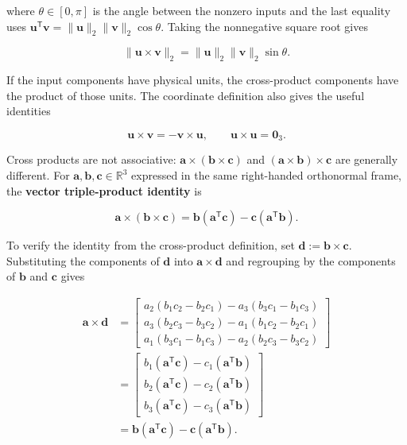 \documentclass[
  australian,
  12pt,
  letterpaper,
  DIV=11,
  numbers=noendperiod,
  twoside]{scrreprt}
\begin{document}
where \(\theta\in[0,\pi]\) is the angle between the nonzero inputs and
the last equality uses
\(\mathbf u^\mathsf T\mathbf v=\|\mathbf u\|_2\|\mathbf v\|_2\cos\theta\).
Taking the nonnegative square root gives

\[
\boxed{
\|\mathbf u\times\mathbf v\|_2
=
\|\mathbf u\|_2\|\mathbf v\|_2\sin\theta
}.
\]

If the input components have physical units, the cross-product
components have the product of those units. The coordinate definition
also gives the useful identities

\[
\boxed{
\mathbf u\times\mathbf v
=
-\mathbf v\times\mathbf u,
\qquad
\mathbf u\times\mathbf u
=
\mathbf 0_3
}.
\]

Cross products are not associative:
\(\mathbf a\times(\mathbf b\times\mathbf c)\) and
\((\mathbf a\times\mathbf b)\times\mathbf c\) are generally different.
For \(\mathbf a,\mathbf b,\mathbf c\in\mathbb R^3\) expressed in the
same right-handed orthonormal frame, the \textbf{vector triple-product
identity} is

\[
\boxed{
\mathbf a\times(\mathbf b\times\mathbf c)
=
\mathbf b(\mathbf a^\mathsf T\mathbf c)
-
\mathbf c(\mathbf a^\mathsf T\mathbf b)
}.
\]

To verify the identity from the cross-product definition, set
\(\mathbf d\mathrel{:=}\mathbf b\times\mathbf c\). Substituting the
components of \(\mathbf d\) into \(\mathbf a\times\mathbf d\) and
regrouping by the components of \(\mathbf b\) and \(\mathbf c\) gives

\[
\begin{aligned}
\mathbf a\times\mathbf d
&=
\begin{bmatrix}
a_2(b_1c_2-b_2c_1)-a_3(b_3c_1-b_1c_3)\\
a_3(b_2c_3-b_3c_2)-a_1(b_1c_2-b_2c_1)\\
a_1(b_3c_1-b_1c_3)-a_2(b_2c_3-b_3c_2)
\end{bmatrix}\\
&=
\begin{bmatrix}
b_1(\mathbf a^\mathsf T\mathbf c)-c_1(\mathbf a^\mathsf T\mathbf b)\\
b_2(\mathbf a^\mathsf T\mathbf c)-c_2(\mathbf a^\mathsf T\mathbf b)\\
b_3(\mathbf a^\mathsf T\mathbf c)-c_3(\mathbf a^\mathsf T\mathbf b)
\end{bmatrix}\\
&=
\mathbf b(\mathbf a^\mathsf T\mathbf c)
-
\mathbf c(\mathbf a^\mathsf T\mathbf b).
\end{aligned}
\]
\end{document}
